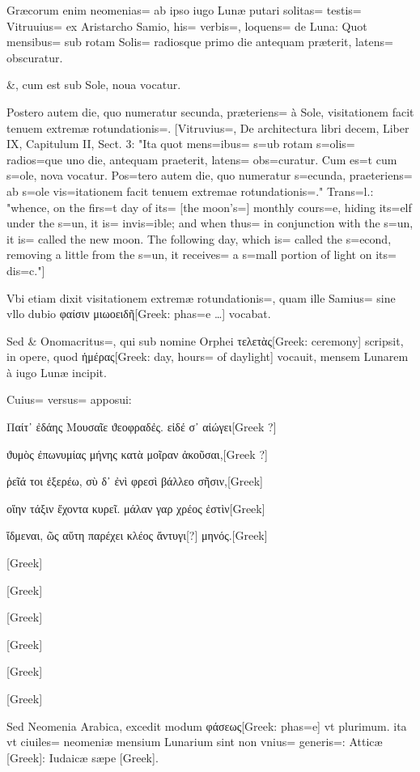\begin{parnumbers}

Græcorum enim neomenias= ab ipso iugo Lunæ putari solitas= testis= Vitruuius= ex Aristarcho Samio, his= verbis=, loquens= de Luna: Quot mensibus= sub rotam Solis= radiosque primo die  antequam præterit, latens= obscuratur.

\&, cum est sub Sole, noua vocatur.

Postero autem die, quo numeratur secunda, præteriens= à Sole, visitationem facit tenuem extremæ rotundationis=. [Vitruvius=, De architectura libri decem, Liber IX, Capitulum II, Sect. 3: "Ita quot mens=ibus= s=ub rotam s=olis= radios=que uno die, antequam praeterit, latens= obs=curatur. Cum es=t cum s=ole, nova vocatur. Pos=tero autem die, quo numeratur s=ecunda, praeteriens= ab s=ole vis=itationem facit tenuem extremae rotundationis=." Trans=l.: "whence, on the firs=t day of its= [the moon's=] monthly cours=e, hiding its=elf under the s=un, it is= invis=ible; and when thus= in conjunction with the s=un, it is= called the new moon. The following day, which is= called the s=econd, removing a little from the s=un, it receives= a s=mall portion of light on its= dis=c."]

Vbi etiam dixit visitationem extremæ rotundationis=, quam ille Samius= sine vllo dubio φαίσιν μιωοειδῆ[Greek: phas=e …] vocabat.

Sed \& Onomacritus=, qui sub nomine Orphei τελετὰς[Greek: ceremony] scripsit, in opere, quod ἡμέρας[Greek: day, hours= of daylight] vocauit, mensem Lunarem à iugo Lunæ incipit.

Cuius= versus= apposui:

Παίτ᾽ ἐδάης Μουσαῖε ϑεοφραδἐς. εἰδέ σ᾽ αἰώγει[Greek ?]

ϑυμὸς ἐπωνυμίας μήνης κατὰ μοῖραν ἀκοῦσαι,[Greek ?]

ῤεῖά τοι ἐξερέω, σὺ δ᾽ ἐνὶ φρεσὶ βάλλεο σῆσιν,[Greek] 

οἵην τάξιν ἔχοντα κυρεῖ. μάλαν γαρ χρέος ἐστὶν[Greek]

ἴδμεναι, ῶς αὕτη παρέχει κλέος ἄντυγι[?] μηνός.[Greek]

[Greek]

[Greek]

[Greek]

[Greek]

[Greek]

[Greek]

Sed Neomenia Arabica, excedit modum φάσεως[Greek: phas=e] vt plurimum. ita vt ciuiles= neomeniæ mensium Lunarium sint non vnius= generis=: Atticæ  [Greek]: Iudaicæ sæpe [Greek].


\end{parnumbers}
